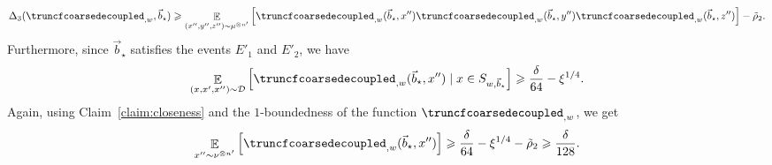 \documentclass[11pt]{article}
\newcommand\Expect[2]{{\mathop{\mathbb{E}}_{#1}\left[ {#2} \right]}}
\renewcommand\geq{\geqslant}
\newcommand{\V}[1]{{#1}}
\begin{document}
\begin{equation}
    \label{eq:decoupled_move_to_uniform}
\Delta_3(\truncfcoarsedecoupled_{, \V w}, \vec{b}_\star) \geq  \Expect{(\V x'', \V y'', \V z'')\sim \mu^{\otimes n'}}{\truncfcoarsedecoupled_{,\V w}(\vec{b}_\star, \V x'') \truncfcoarsedecoupled_{,\V w}(\vec{b}_\star, \V y'') \truncfcoarsedecoupled_{,\V w}(\vec{b}_\star, \V z'')} - \tilde{\rho}_2.
\end{equation}
%
Furthermore, since $\vec{b}_\star$ satisfies the events $E'_1$ and $E'_2$, we have
$$\Expect{(\V x, \V x', \V x'')\sim \mathcal{D}}{\truncfcoarsedecoupled_{,\V w}(\vec{b}_\star,\V x'') \mid \V x\in S_{\V w, \vec{b}_\star} } \geq \frac{\delta}{64}  - \xi^{1/4} .$$
%
Again, using Claim~\ref{claim:closeness} and the  $1$-boundedness of the function $\truncfcoarsedecoupled_{,\V w}$, we get
\begin{equation}\label{eq:dense_F}
\Expect{\V x''\sim \nu^{\otimes n'}}{\truncfcoarsedecoupled_{,\V w}(\vec{b}_\star,\V x'')  } \geq \frac{\delta}{64}  - \xi^{1/4} - \tilde{\rho}_2\geq \frac{\delta}{128}.
\end{equation}
\end{document}
